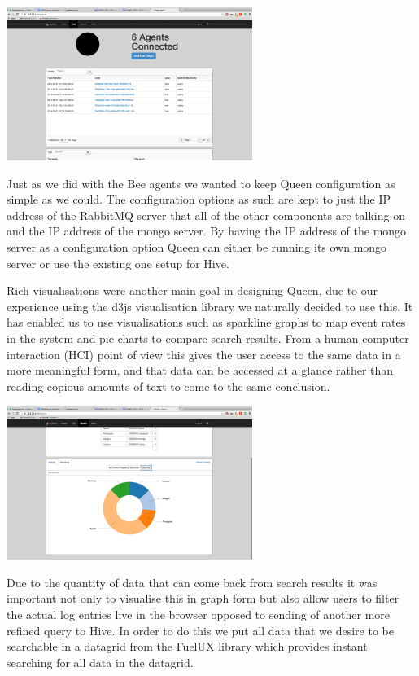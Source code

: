 \vspace{10 mm}
\graphicspath{{./pics/}}
\includegraphics[width=8cm, keepaspectratio]{data.png}
\vspace{10 mm}

Just as we did with the Bee agents we wanted to keep
Queen configuration as
simple as we could. The configuration options as such
are kept to just the IP
address of the RabbitMQ server that all of the other
components are talking on and
the IP address of the mongo server. By having the IP
address of the mongo server
as a configuration option Queen can either be running
its own mongo server or
use the existing one setup for Hive.

Rich visualisations were another main goal in designing
Queen, due to our
experience using the d3js\cite{d3} visualisation library we
naturally decided to use
this. It has enabled us to use visualisations such as
sparkline graphs to map
event rates in the system and pie charts to compare search
results. From a
human computer interaction (HCI) point of view this gives
the user access to the
same data in a more meaningful form, and that data can be
accessed at a glance
rather than reading copious amounts of text to come to the
same conclusion.

\vspace{10 mm}
\graphicspath{{./pics/}}
\includegraphics[width=8cm, keepaspectratio]{search.png}
\vspace{10 mm}

Due to the quantity of data that can come back from search
results it was
important not only to visualise this in graph form but
also allow users to
filter the actual log entries live in the browser opposed
to sending of another
more refined query to Hive. In order to do this we put all
data that we desire
to be searchable in a datagrid from the FuelUX\cite{fuelux} library
which provides instant
searching for all data in the datagrid.

